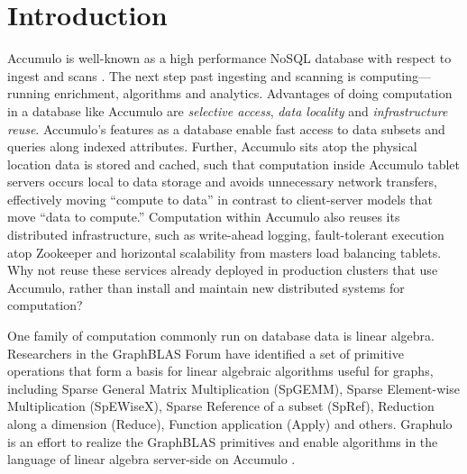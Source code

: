 
\section{Introduction}
\label{sIntro}
% 

Accumulo is well-known as a high performance NoSQL database with respect to ingest and scans \cite{sen2013benchmarking}.
The next step past ingesting and scanning is computing---running enrichment, algorithms and analytics.
Advantages of doing computation in a database like Accumulo %
are \emph{selective access}, \emph{data locality} and \emph{infrastructure reuse}.
Accumulo's features as a database enable fast access to data subsets and queries along indexed attributes.
Further, Accumulo sits atop the physical location data is stored and cached, such that computation inside
Accumulo tablet servers occurs local to data storage and avoids unnecessary network transfers,
effectively moving ``compute to data'' in contrast to client-server models that move ``data to compute.''
Computation within Accumulo also reuses its distributed infrastructure, 
such as write-ahead logging, fault-tolerant execution atop Zookeeper and 
horizontal scalability from masters load balancing tablets.
Why not reuse these services already deployed in production clusters that use Accumulo,
rather than install and maintain new distributed systems for computation?

One family of computation commonly run on database data is linear algebra.
Researchers in the GraphBLAS Forum \cite{x} have identified a set of primitive operations 
that form a basis for linear algebraic algorithms useful for graphs, including 
Sparse General Matrix Multiplication (SpGEMM),  Sparse Element-wise Multiplication (SpEWiseX),
Sparse Reference of a subset (SpRef), Reduction along a dimension (Reduce),
Function application (Apply) and others.
Graphulo is an effort to realize the GraphBLAS primitives 
and enable algorithms in the language of linear algebra server-side on Accumulo \cite{x}.


